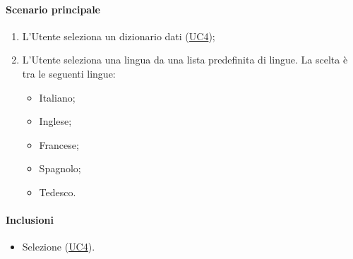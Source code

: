 \paragraph*{Scenario principale}
\begin{enumerate}
  \item L'Utente seleziona un dizionario dati (\hyperref[UC4]{UC4});
  \item L’Utente seleziona una lingua da una lista predefinita di lingue. La scelta è tra le seguenti lingue:
    \begin{itemize}
      \item Italiano;
      \item Inglese;
      \item Francese;
      \item Spagnolo;
      \item Tedesco.
    \end{itemize}
\end{enumerate}

\paragraph*{Inclusioni}
\begin{itemize}
  \item Selezione  (\hyperref[UC4]{UC4}).
\end{itemize}

